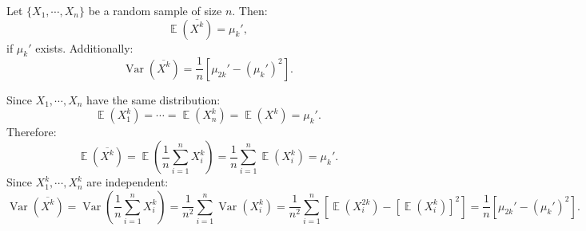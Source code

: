 \documentclass{huhtakm-template-book-v2}
\DeclareMathOperator{\E}{\mathbb{E}}
\DeclareMathOperator{\Var}{Var}
\begin{document}
    \begin{lem}
        Let $\{X_{1}, \cdots, X_{n}\}$ be a random sample of size $n$. Then:
        \begin{equation*}
            \E(\overline{X^{k}}) = \mu_{k}',
        \end{equation*}
        if $\mu_{k}'$ exists. Additionally:
        \begin{equation*}
            \Var(\overline{X^{k}}) = \frac{1}{n} \left[\mu_{2k}' - (\mu_{k}')^{2}\right].
        \end{equation*}
    \end{lem}
    \begin{proofing}
        Since $X_{1}, \cdots, X_{n}$ have the same distribution:
        \begin{equation*}
            \E(X_{1}^{k}) = \cdots = \E(X_{n}^{k}) = \E(X^{k}) = \mu_{k}'.
        \end{equation*}
        Therefore:
        \begin{equation*}
            \E(\overline{X^{k}}) = \E\left(\frac{1}{n} \sum_{i=1}^{n} X_{i}^{k}\right) = \frac{1}{n} \sum_{i=1}^{n} \E(X_{i}^{k}) = \mu_{k}'.
        \end{equation*}
        Since $X_{1}^{k}, \cdots, X_{n}^{k}$ are independent:
        \begin{equation*}
            \Var(\overline{X^{k}}) = \Var\left(\frac{1}{n} \sum_{i=1}^{n} X_{i}^{k}\right) = \frac{1}{n^{2}} \sum_{i=1}^{n} \Var(X_{i}^{k}) = \frac{1}{n^{2}} \sum_{i=1}^{n} \left[\E(X_{i}^{2k}) - [\E(X_{i}^{k})]^{2}\right] = \frac{1}{n} \left[\mu_{2k}' - (\mu_{k}')^{2}\right].
        \end{equation*}
    \end{proofing}
\end{document}
